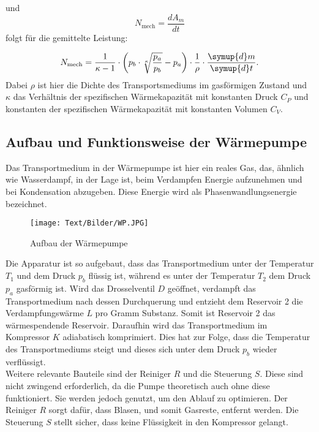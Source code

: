 und
\begin{equation}
  N_\text{mech}=\frac{dA_m}{dt}
\end{equation}
folgt für die gemittelte Leistung:

\begin{equation}
    N_\text{mech} = \frac{1}{\kappa - 1} \cdot \left(p_b \cdot \sqrt[\kappa]{\frac{p_a}{p_b}} - p_a \right) \cdot \frac{1}{\rho} \cdot \frac{\symup{d} m}{\symup{d} t}.
    \label{eqn:leist}
\end{equation}
Dabei $\rho$ ist hier die Dichte des Transportsmediums im gasförmigen Zustand und $\kappa$ das Verhältnis der
spezifischen Wärmekapazität mit konstanten Druck $C_P$ und konstanten der spezifischen Wärmekapazität mit konstanten
Volumen $C_V$.

\subsection{Aufbau und Funktionsweise der Wärmepumpe}
Das Transportmedium in der Wärmepumpe ist hier ein reales Gas, das, ähnlich wie Wasserdampf,
in der Lage ist, beim Verdampfen Energie aufzunehmen und bei Kondensation abzugeben.
Diese Energie wird als Phasenwandlungsenergie bezeichnet.
\begin{figure}[H]
  \centering
  \texttt{[image: Text/Bilder/WP.JPG]}
  \caption{Aufbau der Wärmepumpe \cite[3]{sample}}
  \label{fig:WP}
\end{figure}
Die Apparatur ist so aufgebaut, dass das Transportmedium unter der Temperatur $T_1$ und dem Druck $p_b$ flüssig ist, während
es unter der Temperatur $T_2$ dem Druck $p_a$ gasförmig ist.
Wird das Drosselventil $D$ geöffnet, verdampft das Transportmedium nach dessen Durchquerung und entzieht dem Reservoir 2
die Verdampfungswärme $L$ pro Gramm Substanz.
Somit ist Reservoir 2 das wärmespendende Reservoir.
Daraufhin wird das Transportmedium im Kompressor $K$ adiabatisch komprimiert.
Dies hat zur Folge, dass die Temperatur des Transportmediums steigt und dieses sich unter dem Druck $p_b$ wieder verflüssigt.
\\
Weitere relevante Bauteile sind der Reiniger $R$ und die Steuerung $S$.
Diese sind nicht zwingend erforderlich, da die Pumpe theoretisch auch ohne diese funktioniert.
Sie werden jedoch genutzt, um den Ablauf zu optimieren.
Der Reiniger $R$ sorgt dafür, dass Blasen, und somit Gasreste, entfernt werden.
Die Steuerung $S$ stellt sicher, dass keine Flüssigkeit in den Kompressor gelangt.
